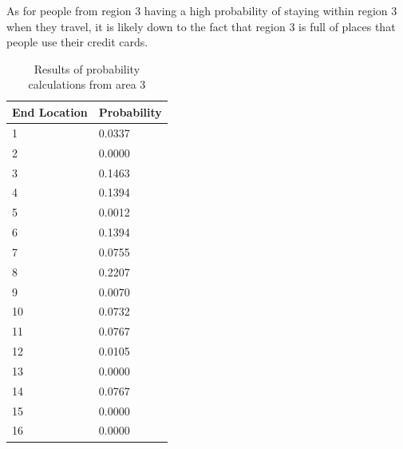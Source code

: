 \noindent As for people from region 3 having a high probability of staying within region 3 when they travel, it is likely down to the fact that region 3 is full of places that people use their credit cards.

\begin{table}[H]
\begin{center}
\begin{tabular}{|l|l|}
\hline
End Location & Probability \\ \hline \hline
	1  &  0.0337 \\ \hline
    2  &  0.0000 \\ \hline
    3  &  0.1463 \\ \hline
    4  &  0.1394 \\ \hline
    5  &  0.0012 \\ \hline
    6  &  0.1394 \\ \hline
    7  &  0.0755 \\ \hline
    8  &  0.2207 \\ \hline
    9  &  0.0070 \\ \hline
   10 &  0.0732 \\ \hline
   11  &  0.0767 \\ \hline
   12 &  0.0105 \\ \hline
   13 &  0.0000 \\ \hline
   14  &  0.0767 \\ \hline
   15 &  0.0000 \\ \hline
   16 &  0.0000\\ \hline

\end{tabular}
\caption{\label{table:fromwork}Results of probability calculations from area 3}
\end{center}
\end{table}
